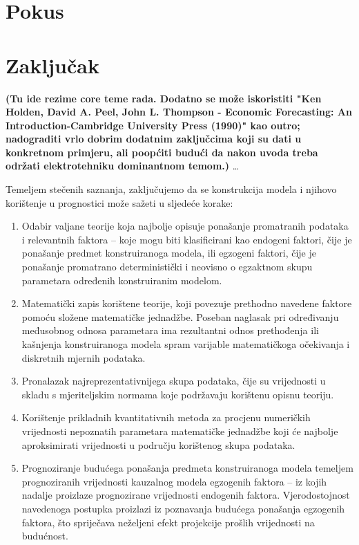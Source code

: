 \documentclass[a4paper,12pt,oneside]{memoir}
\begin{document}
    \chapter{Pokus}
    \chapter{Zaključak}
        \textbf{(Tu ide rezime core teme rada. Dodatno se može iskoristiti "Ken Holden, David A. Peel, John L. Thompson - Economic Forecasting: An Introduction-Cambridge University Press (1990)" kao outro; nadograditi vrlo dobrim dodatnim zaključcima koji su dati u konkretnom primjeru, ali poopćiti budući da nakon uvoda treba održati elektrotehniku dominantnom temom.)} %
        \ldots{}


        Temeljem stečenih saznanja, zaključujemo da se konstrukcija modela i njihovo korištenje u prognostici može sažeti u sljedeće korake:
        \begin{enumerate}
            \item Odabir valjane teorije koja najbolje opisuje ponašanje promatranih podataka i relevantnih faktora -- koje mogu biti klasificirani kao endogeni faktori, čije je ponašanje predmet konstruiranoga modela, ili egzogeni faktori, čije je ponašanje promatrano deterministički i neovisno o egzaktnom skupu parametara određenih konstruiranim modelom.
            \item Matematički zapis korištene teorije, koji povezuje prethodno navedene faktore pomoću složene matematičke jednadžbe. Poseban naglasak pri određivanju međusobnog odnosa parametara ima rezultantni odnos prethođenja ili kašnjenja konstruiranoga modela spram varijable matematičkoga očekivanja i diskretnih mjernih podataka.
            \item Pronalazak najreprezentativnijega skupa podataka, čije su vrijednosti u skladu s mjeriteljskim normama koje podržavaju korištenu opisnu teoriju.
            \item Korištenje prikladnih kvantitativnih metoda za procjenu numeričkih vrijednosti nepoznatih parametara matematičke jednadžbe koji će najbolje aproksimirati vrijednosti u području korištenog skupa podataka.
            \item Prognoziranje budućega ponašanja predmeta konstruiranoga modela temeljem prognoziranih vrijednosti kauzalnog modela egzogenih faktora -- iz kojih nadalje proizlaze prognozirane vrijednosti endogenih faktora. Vjerodostojnost navedenoga postupka proizlazi iz poznavanja budućega ponašanja egzogenih faktora, što spriječava neželjeni efekt projekcije prošlih vrijednosti na budućnost.
        \end{enumerate}
\end{document}
